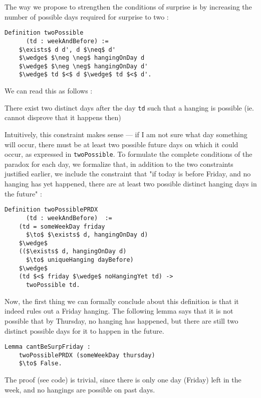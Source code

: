 \documentclass[journal]{journal}
\newenvironment{myindent}{\begin{adjustwidth}{1cm}{}}{\end{adjustwidth}}
\begin{document}
The way we propose to strengthen the conditions of surprise is by increasing
the number of possible days required for surprise to two :

\begin{lstlisting}[mathescape=true]
  Definition twoPossible
      (td : weekAndBefore) :=
    $\exists$ d d', d $\neq$ d'
    $\wedge$ $\neg \neg$ hangingOnDay d
    $\wedge$ $\neg \neg$ hangingOnDay d'
    $\wedge$ td $<$ d $\wedge$ td $<$ d'.
\end{lstlisting}

We can read this as follows :

\begin{myindent}
  There exist two distinct days after the day {\tt td} such that
  a hanging is possible (ie. cannot disprove that it happens then)
\end{myindent}

Intuitively, this constraint makes sense --- if I am not sure what day something
will occur, there must be at least two possible future days on which it could occur,
as expressed in {\tt twoPossible}.
To formulate the complete conditions of the paradox for each day, we formalize that, in addition
to the two constraints justified earlier, we include the constraint that
"if today is before Friday, and no hanging has yet happened, there are at least
two possible distinct hanging days in the future" :

\begin{lstlisting}[mathescape=true]
  Definition twoPossiblePRDX
      (td : weekAndBefore)  :=
    (td = someWeekDay friday
      $\to$ $\exists$ d, hangingOnDay d)
    $\wedge$
    (($\exists$ d, hangingOnDay d)
      $\to$ uniqueHanging dayBefore)
    $\wedge$
    (td $<$ friday $\wedge$ noHangingYet td) ->
      twoPossible td.
\end{lstlisting}

Now, the first thing we can formally conclude about this definition is that it indeed rules out
a Friday hanging. The following lemma says that it is not possible that by Thursday,
no hanging has happened, but there are still two distinct possible days for it to
happen in the future.

\begin{lstlisting}[mathescape=true]
  Lemma cantBeSurpFriday :
    twoPossiblePRDX (someWeekDay thursday)
    $\to$ False.
\end{lstlisting}

The proof (see code) is trivial, since there is only one day (Friday) left in the week,
and no hangings are possible on past days.
\end{document}
